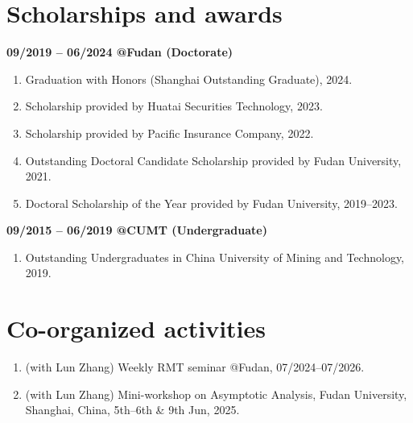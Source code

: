 \documentclass[margin]{res}
\begin{document}
\begin{resume}
\section{Scholarships and awards}
\textbf{09/2019 -- 06/2024 @Fudan (Doctorate)}
\begin{enumerate}[--]
    \item Graduation with Honors (Shanghai Outstanding Graduate), 2024.
    \item Scholarship provided by Huatai Securities Technology, 2023.
    \item Scholarship provided by Pacific Insurance Company, 2022. 
    \item Outstanding Doctoral Candidate Scholarship provided by Fudan University, 2021. 
    \item Doctoral Scholarship of the Year provided by Fudan University, 2019--2023. 
\end{enumerate}

\textbf{09/2015 -- 06/2019 @CUMT (Undergraduate)}
\begin{enumerate}[--]
    \item Outstanding Undergraduates in China University of Mining and Technology, 2019.
\end{enumerate}


\section{Co-organized activities}
\begin{enumerate}[--]
    \item (with Lun Zhang) Weekly RMT seminar @Fudan, 07/2024--07/2026.
    \item (with Lun Zhang) Mini-workshop on Asymptotic Analysis, Fudan University, Shanghai, China, 5th--6th \& 9th Jun, 2025.
\end{enumerate}


\end{resume}
\end{document}
